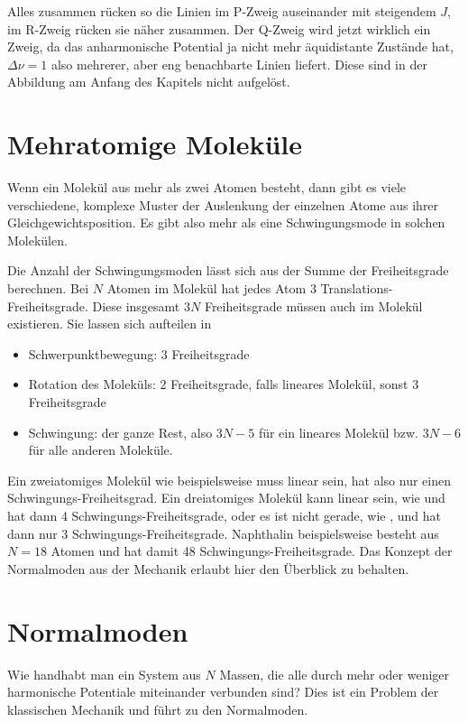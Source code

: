 Alles zusammen rücken so die Linien im P-Zweig auseinander mit steigendem $J$, im R-Zweig rücken sie näher zusammen. Der Q-Zweig wird jetzt wirklich ein Zweig, da das anharmonische Potential ja nicht mehr äquidistante Zustände hat, $\Delta \nu = 1$ also mehrerer, aber eng benachbarte Linien liefert. Diese sind in der Abbildung am Anfang des Kapitels nicht aufgelöst.


\section{Mehratomige Moleküle}

Wenn ein Molekül aus mehr als zwei Atomen besteht, dann gibt es viele verschiedene, komplexe Muster der Auslenkung der einzelnen Atome aus ihrer Gleichgewichtsposition. Es gibt also mehr als eine Schwingungsmode in solchen Molekülen.

Die Anzahl der Schwingungsmoden lässt sich aus der Summe der Freiheitsgrade berechnen. Bei $N$ Atomen im Molekül hat jedes Atom $3$ Translations-Freiheitsgrade. Diese insgesamt $3N$ Freiheitsgrade müssen auch im Molekül existieren. Sie lassen sich aufteilen in
\begin{itemize} \setlength{\itemsep}{0pt}
\item Schwerpunktbewegung: 3 Freiheitsgrade
\item Rotation des Moleküls: 2 Freiheitsgrade, falls lineares Molekül, sonst 3 Freiheitsgrade
\item Schwingung: der ganze Rest, also $3N-5$ für ein lineares Molekül bzw. $3N-6$ für alle anderen Moleküle. 
\end{itemize}

Ein zweiatomiges Molekül wie beispielsweise  muss linear sein, hat also nur einen Schwingungs-Freiheitsgrad. Ein dreiatomiges Molekül kann linear sein, wie  und hat dann 4  Schwingungs-Freiheitsgrade, oder es ist nicht gerade, wie , und hat dann nur 3  Schwingungs-Freiheitsgrade. Naphthalin beispielsweise besteht aus $N=18$ Atomen und hat damit  48 Schwingungs-Freiheitsgrade. Das Konzept der Normalmoden aus der Mechanik erlaubt hier den Überblick zu behalten.


\section{Normalmoden}

Wie handhabt man ein System aus $N$ Massen, die alle durch mehr oder weniger harmonische Potentiale miteinander verbunden sind? Dies ist ein Problem der klassischen Mechanik und führt zu den Normalmoden.

